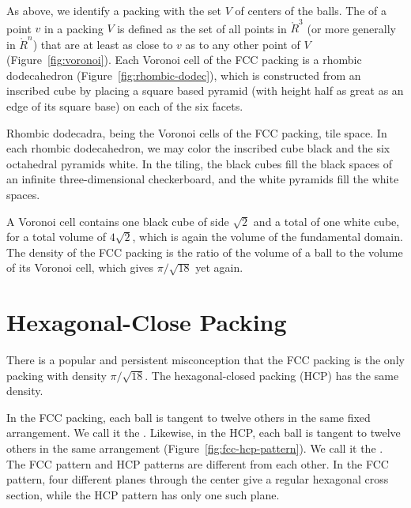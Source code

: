 As above, we identify a packing with the set $V$ of centers of the
balls.  The  of a point $v$ in a packing $V$ is
defined as the set of all points in $\ring{R}^3$ (or more generally in
$\ring{R}^n$) that are at least as close to $v$ as to any other point
of $V$ (Figure~\ref{fig:voronoi}).  Each Voronoi cell of the FCC
packing is a rhombic dodecahedron
(Figure~\ref{fig:rhombic-dodec}),
which is constructed from an inscribed cube by placing a square based pyramid
(with height half as great as an edge of its square base) on each of
the six facets.

\figEVIAIQP %

\figPQJIJGE %

Rhombic dodecadra, being the Voronoi cells of the FCC packing, tile space.
In each rhombic dodecahedron, we 
may color the inscribed cube black and the six octahedral pyramids
white.  In the tiling, 
the black cubes fill the black spaces of an infinite three-dimensional
checkerboard, and the white pyramids fill the white spaces.

A Voronoi cell contains one black cube of side $\sqrt2$ and a total
of one white cube, for a total volume of $4\sqrt2$, which is
again the volume of the fundamental domain.  The density of the
FCC packing is the ratio of the volume of a ball to the volume
of its Voronoi cell, which gives $\pi/\sqrt{18}$ yet again.



\section{Hexagonal-Close Packing}\label{sec:hcp}

There is a popular and persistent misconception that the FCC
 packing is the only packing with density $\pi/\sqrt{18}$.
The hexagonal-closed packing (HCP) has the same density.
%
%
%
%

In the FCC packing, each ball is tangent to twelve others in the same
fixed arrangement.  We call it the .  Likewise,
in the HCP, each ball is tangent to twelve others in the same
arrangement (Figure~\ref{fig:fcc-hcp-pattern}).  We call it the
.  The FCC pattern and HCP patterns are different
from each other.  In the FCC pattern, four different planes through
the center give a regular hexagonal cross section, while the HCP
pattern has only one such plane.

